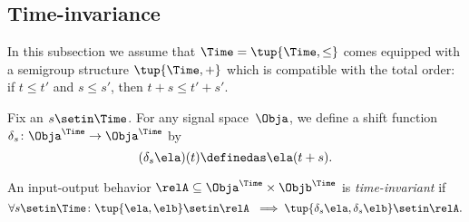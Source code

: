 
\subsection{Time-invariance}

In this subsection we assume that $\Time = \tup{\Time, \leq}$ comes equipped with a semigroup structure $\tup{\Time, +}$ which is compatible with the total order: if $t \leq t'$ and $s \leq s'$, then $t + s \leq t' + s'$.

Fix an $s \setin \Time$.
For any signal space~$\Obja$, we define a shift function~$\delta_s\colon \Obja^\Time \to \Obja^\Time$ by
\begin{equation*}
    (\delta_s \ela)(t) \definedas \ela(t + s).
\end{equation*}

\begin{definition}
    An input-output behavior $\relA \subseteq \Obja^\Time \times \Objb^\Time$ is \emph{time-invariant} if
    \begin{equation*}
        \forall s \setin \Time\colon \tup{\ela, \elb} \setin \relA  \ \implies \tup{\delta_s \ela, \delta_s \elb} \setin \relA.
    \end{equation*}
\end{definition}


